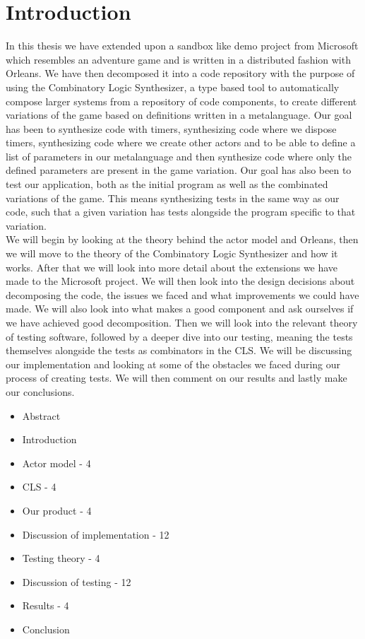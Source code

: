 \section{Introduction}
In this thesis we have extended upon a sandbox like demo project from Microsoft \cite{AdventureGame} which resembles an adventure game and is written in a distributed fashion with Orleans. We have then decomposed it into a code repository with the  purpose of using the Combinatory Logic Synthesizer, a type based tool to automatically compose larger systems from a repository of code components, to create different variations of the game based on definitions written in a metalanguage. Our goal has been to synthesize code with timers, synthesizing code where we dispose timers, synthesizing code where we create other actors and to be able to define a list of parameters in our metalanguage and then synthesize code where only the defined parameters are present in the game variation. Our goal has also been to test our application, both as the initial program as well as the combinated variations of the game. This means synthesizing tests in the same way as our code, such that a given variation has tests alongside the program specific to that variation. 
\\
We will begin by looking at the theory behind the actor model and Orleans, then we will move to the theory of the Combinatory Logic Synthesizer and how it works. After that we will look into more detail about the extensions we have made to the Microsoft project. We will then look into the design decisions about decomposing the code, the issues we faced and what improvements we could have made. We will also look into what makes a good component and ask ourselves if we have achieved good decomposition. 
Then we will look into the relevant theory of testing software, followed by a deeper dive into our testing, meaning the tests themselves alongside the tests as combinators in the CLS. We will be discussing our implementation and looking at some of the obstacles we faced during our process of creating tests. We will then comment on our results and lastly make our conclusions.
\begin{itemize}
	\item Abstract
	\item Introduction
	\item Actor model - 4
	\item CLS - 4
	\item Our product - 4
	\item Discussion of implementation - 12
	\item Testing theory - 4
	\item Discussion of testing - 12
	\item Results - 4
	\item Conclusion
\end{itemize}